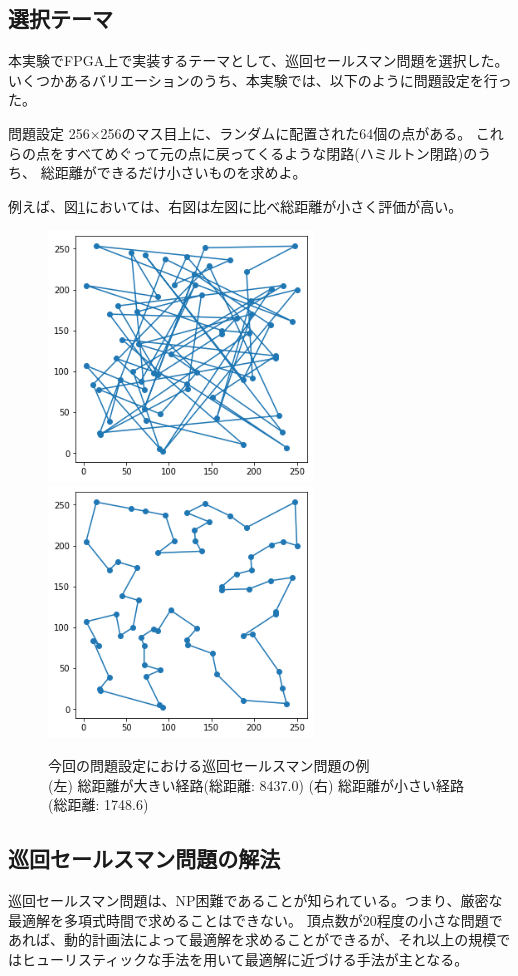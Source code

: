 \subsection*{選択テーマ}
本実験でFPGA上で実装するテーマとして、巡回セールスマン問題を選択した。
いくつかあるバリエーションのうち、本実験では、以下のように問題設定を行った。
\begin{itembox}[l]{問題設定}
    256×256のマス目上に、ランダムに配置された64個の点がある。
    これらの点をすべてめぐって元の点に戻ってくるような閉路(ハミルトン閉路)のうち、
    総距離ができるだけ小さいものを求めよ。
\end{itembox}
例えば、図\ref{fig:tspsapmle}においては、右図は左図に比べ総距離が小さく評価が高い。
\begin{figure}[h]
    \label{fig:tspsapmle}
    \begin{center}
        \includegraphics[width=7cm]{figure/tsp_bad.png}
        \includegraphics[width=7cm]{figure/tsp_good.png}
        \caption{
            今回の問題設定における巡回セールスマン問題の例\\
            (左) 総距離が大きい経路(総距離: 8437.0)
            (右) 総距離が小さい経路(総距離: 1748.6)
        }
    \end{center}
\end{figure}
\subsection*{巡回セールスマン問題の解法}
巡回セールスマン問題は、NP困難であることが知られている。つまり、厳密な最適解を多項式時間で求めることはできない。
頂点数が20程度の小さな問題であれば、動的計画法によって最適解を求めることができるが、それ以上の規模ではヒューリスティックな手法を用いて最適解に近づける手法が主となる。



